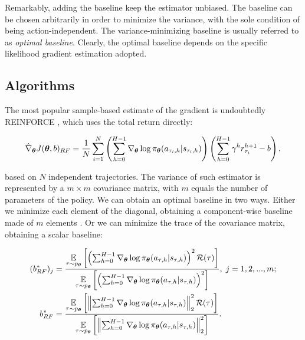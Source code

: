 Remarkably, adding the baseline keep the estimator unbiased. The baseline can be chosen arbitrarily in order to minimize the variance, with the sole condition of being action-independent. The variance-minimizing baseline is usually referred to as \emph{optimal baseline}.  Clearly, the optimal baseline depends on the specific likelihood gradient estimation adopted.

\subsection{Algorithms} \label{subsec:algorithms}
The most popular sample-based estimate of the gradient is undoubtedly REINFORCE \cite{williams1992simple}, which uses the total return directly:

\begin{align}
\hat{\nabla}_{\vtheta}J(\vtheta, b)_{RF} = \frac{1}{N}\sum_{i=1}^{N}\left(\sum_{h=0}^{H-1}\nabla_{\vtheta}\log\pi_{\vtheta}(a_{\tau_i,h}|s_{\tau_i,h}) \right)\left(\sum_{h=0}^{H-1}\gamma^h r^{h+1}_{\tau_i} - b \right), \label{eq:REINFORCE}
\end{align}

based on $N$ independent trajectories. The variance of such estimator is represented by a $m\times m$ covariance matrix, with $m$ equals the number of parameters of the policy. We can obtain an optimal baseline in two ways. Either we minimize each element of the diagonal, obtaining a component-wise baseline made of $m$ elements \cite{peters2008reinforcement}. Or we can minimize the trace of the covariance matrix, obtaining a scalar baseline\cite{zhao2011analysis}:

\begin{align}
(b^*_{RF})_{j} &= \frac{\myExpu{\tau\sim p_{\vtheta}}{\left(\sum_{h=0}^{H-1}\nabla_{\vtheta}\log\pi_{\vtheta}(a_{\tau,h}|s_{\tau,h})\right)^2\Rew(\tau)}}{\myExpu{\tau\sim p_{\vtheta}}{\left(\sum_{h=0}^{H-1}\nabla_{\vtheta}\log\pi_{\vtheta}(a_{\tau,h}|s_{\tau,h})\right)^2}}, \; j=1,2,...,m; \\
b^*_{RF} &= \frac{\myExpu{\tau\sim p_{\vtheta}}{\norm[2]{\sum_{h=0}^{H-1}\nabla_{\vtheta}\log\pi_{\vtheta}(a_{\tau,h}|s_{\tau,h})}^2\Rew(\tau)}}{\myExpu{\tau\sim p_{\vtheta}}{\norm[2]{\sum_{h=0}^{H-1}\nabla_{\vtheta}\log\pi_{\vtheta}(a_{\tau,h}|s_{\tau,h})}^2}}.
\end{align}

